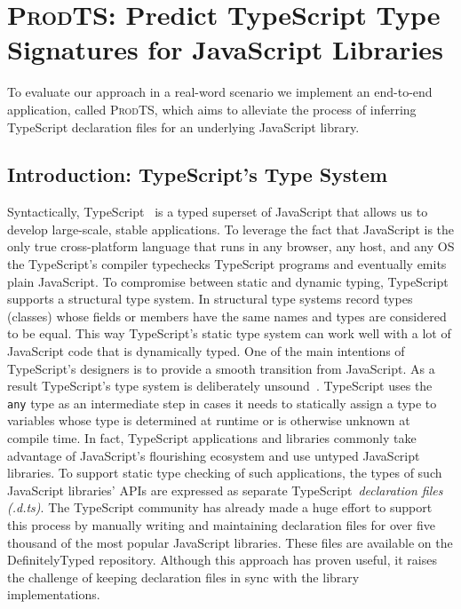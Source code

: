 \documentclass[sigplan,10pt,anonymous]{acmart} %
\newcommand{\prodts}{\textsc{ProdTS}\xspace}
\theoremstyle{plain}
\theoremstyle{remark}
\theoremstyle{definition}
\begin{document}
\section{\prodts: Predict TypeScript Type Signatures for JavaScript Libraries}
\label{sec:prodts}
To evaluate our approach in a real-word scenario we
implement an end-to-end application, called \prodts, which aims
to alleviate the process of inferring TypeScript declaration files
for an underlying JavaScript library.

\subsection{Introduction: TypeScript's Type System}\label{ssec:intro-typescript}
Syntactically, TypeScript~\citep{typescript} is a typed superset of
JavaScript that allows us to develop large-scale, stable applications.
To leverage the fact that JavaScript is the only true cross-platform
language that runs in any browser, any host, and any OS the TypeScript's
compiler typechecks TypeScript programs and eventually emits plain JavaScript.
To compromise between static and dynamic typing, TypeScript supports a
structural type system.
In structural type systems record types (classes) whose fields or members have the same names and types are considered to be equal.
This way TypeScript's static type system can work well with a lot of JavaScript code that is dynamically typed.
One of the main intentions of TypeScript's designers is to
provide a smooth transition from JavaScript.
%
As a result TypeScript's type system is deliberately unsound~\citep{understandtypescript}.
TypeScript uses the \texttt{any} type as an intermediate
step in cases it needs to statically assign a type to variables
whose type is determined at runtime or is otherwise unknown at compile time.
%
In fact, TypeScript applications and libraries commonly take advantage of JavaScript's flourishing ecosystem
and use untyped JavaScript libraries.
To support static type checking of such applications,
the types of such JavaScript libraries' APIs are expressed
as separate TypeScript~\emph{declaration files} \textit{(.d.ts)}.
The TypeScript community has already
made a huge effort to support this process by manually writing and maintaining
declaration files for over five thousand of the most popular JavaScript
libraries. These files are available on the DefinitelyTyped
\citep{definitelytyped} repository. Although this approach has proven
useful, it raises the challenge of keeping declaration files
in sync with the library implementations.
\end{document}
